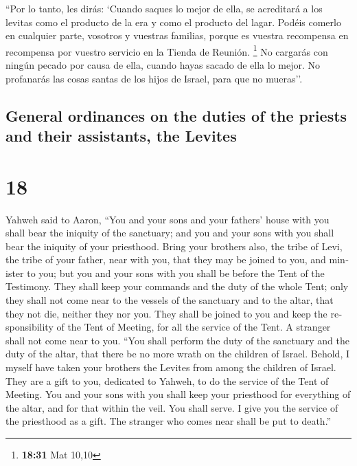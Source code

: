 \begin{paracol}{2}
 ``Por lo tanto, les dirás: `Cuando saques lo mejor de
ella, se acreditará a los levitas como el producto de la era y como el
producto del lagar.  Podéis comerlo en cualquier parte,
vosotros y vuestras familias, porque es vuestra recompensa en recompensa
por vuestro servicio en la Tienda de Reunión. \footnote{\textbf{18:31}
  Mat 10,10}  No cargarás con ningún pecado por causa de
ella, cuando hayas sacado de ella lo mejor. No profanarás las cosas
santas de los hijos de Israel, para que no mueras''.

\switchcolumn
\begin{otherlanguage}{english}

\hypertarget{general-ordinances-on-the-duties-of-the-priests-and-their-assistants-the-levites}{%
\subsection{General ordinances on the duties of the priests and their
assistants, the
Levites}\label{general-ordinances-on-the-duties-of-the-priests-and-their-assistants-the-levites}}

\hypertarget{section-35}{%
\section{18}\label{section-35}}

 Yahweh said to Aaron, ``You and your sons and your
fathers' house with you shall bear the iniquity of the sanctuary; and
you and your sons with you shall bear the iniquity of your priesthood.
 Bring your brothers also, the tribe of Levi, the tribe of
your father, near with you, that they may be joined to you, and minister
to you; but you and your sons with you shall be before the Tent of the
Testimony.  They shall keep your commands and the duty of
the whole Tent; only they shall not come near to the vessels of the
sanctuary and to the altar, that they not die, neither they nor you.
 They shall be joined to you and keep the responsibility
of the Tent of Meeting, for all the service of the Tent. A stranger
shall not come near to you.  ``You shall perform the duty
of the sanctuary and the duty of the altar, that there be no more wrath
on the children of Israel.  Behold, I myself have taken
your brothers the Levites from among the children of Israel. They are a
gift to you, dedicated to Yahweh, to do the service of the Tent of
Meeting.  You and your sons with you shall keep your
priesthood for everything of the altar, and for that within the veil.
You shall serve. I give you the service of the priesthood as a gift. The
stranger who comes near shall be put to death.''


\end{otherlanguage}
\end{paracol}
